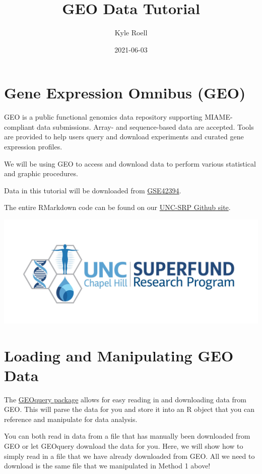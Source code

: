 \documentclass[
]{book}
\title{GEO Data Tutorial}
\author{Kyle Roell}
\date{2021-06-03}
\begin{document}
\maketitle

{
\setcounter{tocdepth}{1}
\tableofcontents
}
\hypertarget{gene-expression-omnibus-geo}{%
\chapter{Gene Expression Omnibus (GEO)}\label{gene-expression-omnibus-geo}}

GEO is a public functional genomics data repository supporting MIAME-compliant data submissions. Array- and sequence-based data are accepted. Tools are provided to help users query and download experiments and curated gene expression profiles.

We will be using GEO to access and download data to perform various statistical and graphic procedures.

Data in this tutorial will be downloaded from \href{https://www.ncbi.nlm.nih.gov/geo/query/acc.cgi?acc=GSE42394}{GSE42394}.

The entire RMarkdown code can be found on our \href{https://github.com/kyleroell/test}{UNC-SRP Github site}.

\includegraphics{TestBook_files/figure-html/UNCSRP_image.jpg}

\hypertarget{geoquery}{%
\chapter{Loading and Manipulating GEO Data}\label{geoquery}}

The \href{https://www.bioconductor.org/packages/release/bioc/html/GEOquery.html}{GEOquery package} allows for easy reading in and downloading data from GEO. This will parse the data for you and store it into an R object that you can reference and manipulate for data analysis.

You can both read in data from a file that has manually been downloaded from GEO or let GEOquery download the data for you. Here, we will show how to simply read in a file that we have already downloaded from GEO. All we need to download is the same file that we manipulated in Method 1 above!
\end{document}
